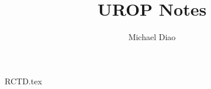 \documentclass[12pt,letterpaper]{scrartcl}
\newcommand*{\importchapter}[1]{{#1.tex}}
\begin{document}
\title{UROP Notes}
\author{Michael Diao}
\date{\vspace{-5ex}}

\maketitle

\importchapter{RCTD}
\end{document}
